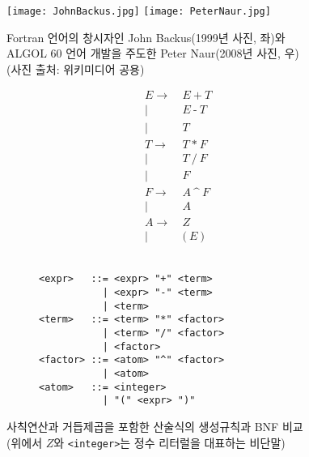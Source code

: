 \begin{figure}\centering
\texttt{[image: JohnBackus.jpg]}
\qquad\qquad\qquad
\texttt{[image: PeterNaur.jpg]}
\caption{Fortran 언어의 창시자인 John Backus(1999년 사진, 좌)와\\
         ALGOL 60 언어 개발을 주도한 Peter Naur(2008년 사진, 우)\\
         {\scriptsize(사진 출처: 위키미디어 공용)}\label{fig:BackusNaur}}
\end{figure}
\begin{figure}[H]\vspace*{-4ex}
\hfill
\begin{subfigure}[b]{.2\linewidth}\addtolength{\jot}{-.3em}
\begin{align*}
E \to~& E ~\texttt{+}~ T \\
 \mid~& E ~\texttt{-}~ T \\
 \mid~& T \\
T \to~& T ~\texttt{*}~ F \\
 \mid~& T ~\texttt{/}~ F \\
 \mid~& F \\
F \to~& A ~\texttt{\char`^}~ F \\
 \mid~& A \\
A \to~& Z \\
 \mid~& \texttt{(}~ E ~\texttt{)}
\end{align*}
~\vspace*{-2.8ex}
\end{subfigure}
\qquad\qquad
\begin{subfigure}[b]{.6\linewidth}
\begin{lstlisting}
<expr>   ::= <expr> "+" <term>
           | <expr> "-" <term>
           | <term>
<term>   ::= <term> "*" <factor>
           | <term> "/" <factor>
           | <factor>
<factor> ::= <atom> "^" <factor>
           | <atom>
<atom>   ::= <integer>
           | "(" <expr> ")"
\end{lstlisting}
\end{subfigure}
\caption{사칙연산과 거듭제곱을 포함한 산술식의 생성규칙과 BNF 비교\\
         {\small(위에서 $Z$와 \texttt{<integer>}는 정수 리터럴을 대표하는 비단말)}
         \label{fig:BNF}}
\end{figure}
